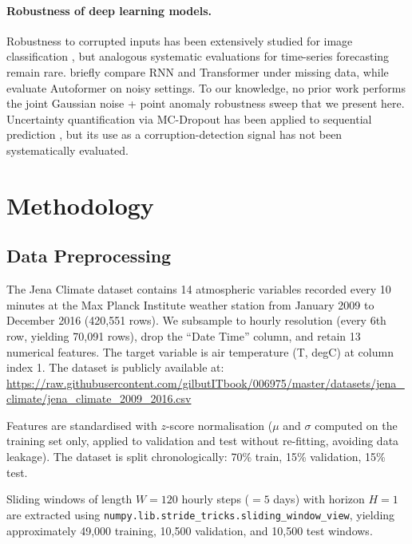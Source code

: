 \documentclass[runningheads]{llncs}
\begin{document}
\paragraph{Robustness of deep learning models.}
Robustness to corrupted inputs has been extensively studied for image classification \cite{hendrycks2019benchmarking}, but analogous systematic evaluations for time-series forecasting remain rare. \citet{karim2019multivariate} briefly compare RNN and Transformer under missing data, while \citet{wu2021autoformer} evaluate Autoformer on noisy settings. To our knowledge, no prior work performs the joint Gaussian noise + point anomaly robustness sweep that we present here. Uncertainty quantification via MC-Dropout \cite{gal2016dropout} has been applied to sequential prediction \cite{zhu2017deep}, but its use as a corruption-detection signal has not been systematically evaluated.

\section{Methodology}
\label{sec:method}

\subsection{Data Preprocessing}
\label{sec:preproc}

The Jena Climate dataset \cite{keras2015jena} contains 14 atmospheric variables recorded every 10 minutes at the Max Planck Institute weather station from January 2009 to December 2016 (420,551 rows). We subsample to hourly resolution (every 6th row, yielding 70,091 rows), drop the ``Date Time'' column, and retain 13 numerical features. The target variable is air temperature (T, degC) at column index 1. The dataset is publicly available at: \url{https://raw.githubusercontent.com/gilbutITbook/006975/master/datasets/jena_climate/jena_climate_2009_2016.csv}

Features are standardised with $z$-score normalisation ($\mu$ and $\sigma$ computed on the training set only, applied to validation and test without re-fitting, avoiding data leakage). The dataset is split chronologically: 70\% train, 15\% validation, 15\% test.

Sliding windows of length $W = 120$ hourly steps ($= 5$ days) with horizon $H = 1$ are extracted using \texttt{numpy.lib.stride\_tricks.sliding\_window\_view}, yielding approximately 49,000 training, 10,500 validation, and 10,500 test windows.
\end{document}

